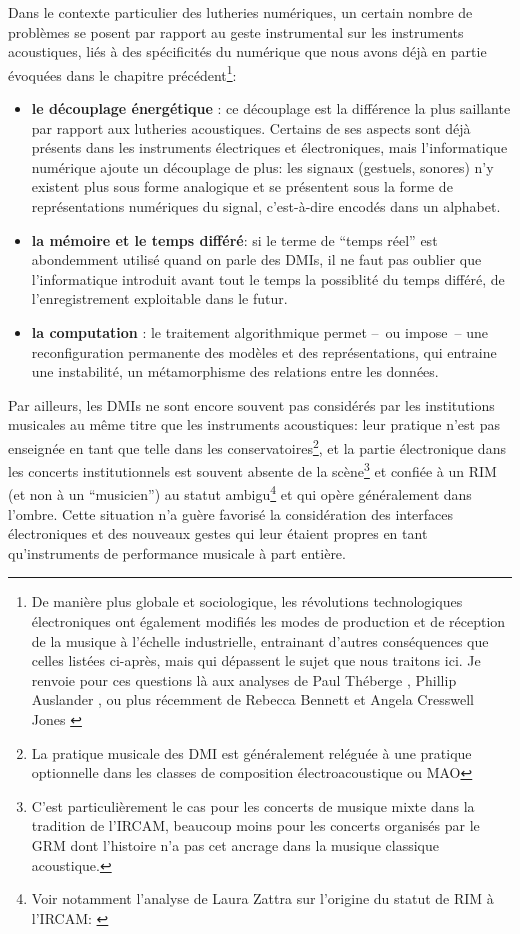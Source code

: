 \noindent Dans le contexte particulier des lutheries numériques, un certain nombre de problèmes se posent par rapport au geste instrumental sur les instruments acoustiques, liés à des spécificités du numérique que nous avons déjà en partie évoquées dans le chapitre précédent\footnote{De manière plus globale et sociologique, les révolutions technologiques électroniques ont également modifiés les modes de production et de réception de la musique à l'échelle industrielle, entrainant d'autres conséquences que celles listées ci-après, mais qui dépassent le sujet que nous traitons ici. Je renvoie pour ces questions là aux analyses de Paul Théberge \cite{theberge_any_1997}, Phillip Auslander \cite{auslander_liveness:_2008}, ou plus récemment de Rebecca Bennett et Angela Cresswell Jones \cite{jones_digital_2015}}:
\vspace{-1em}
\begin{itemize}[noitemsep]
	\item \textbf{le découplage énergétique} : ce découplage est la différence la plus saillante par rapport aux lutheries acoustiques. Certains de ses aspects sont déjà présents dans les instruments électriques et électroniques, mais l'informatique numérique ajoute un découplage de plus: les signaux (gestuels, sonores) n'y existent plus sous forme analogique et se présentent sous la forme de représentations numériques du signal, c'est-à-dire encodés dans un alphabet.
	\item \textbf{la mémoire et le temps différé}: si le terme de ``temps réel'' est abondemment utilisé quand on parle des \glspl{DMI}, il ne faut pas oublier que l'informatique introduit avant tout le temps la possiblité du temps différé, de l'enregistrement exploitable dans le futur.
	\item \textbf{la computation} : le traitement algorithmique permet --~ou impose~-- une reconfiguration permanente des modèles et des représentations, qui entraine une instabilité, un métamorphisme des relations entre les données.
\end{itemize}
\noindent Par ailleurs, les \glspl{DMI} ne sont encore souvent pas considérés par les institutions musicales au même titre que les instruments acoustiques: leur pratique n'est pas enseignée en tant que telle dans les conservatoires\footnote{La pratique musicale des \gls{DMI} est généralement reléguée à une pratique optionnelle dans les classes de composition électroacoustique ou \gls{MAO}}, et la partie électronique dans les concerts institutionnels est souvent absente de la scène\footnote{C'est particulièrement le cas pour les concerts de musique mixte dans la tradition de l'\gls{IRCAM}, beaucoup moins pour les concerts organisés par le \gls{GRM} dont l'histoire n'a pas cet ancrage dans la musique classique acoustique.} et confiée à un \gls{RIM} (et non à un ``musicien'') au statut ambigu\footnote{Voir notamment l'analyse de Laura Zattra sur l'origine du statut de \gls{RIM} à l'\gls{IRCAM}: \cite{zattra_les_2013}} et qui opère généralement dans l'ombre. Cette situation n'a guère favorisé la considération des interfaces électroniques et des nouveaux gestes qui leur étaient propres en tant qu'instruments de performance musicale à part entière.


